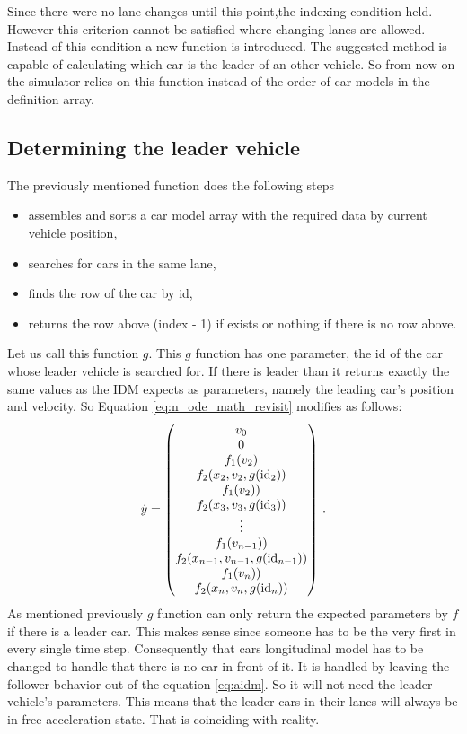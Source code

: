 		Since there were no lane changes until this point,the indexing condition held. However this criterion cannot be satisfied where changing lanes are allowed. Instead of this condition a new function is introduced. The suggested method is capable of calculating which car is the leader of an other vehicle. So from now on the simulator relies on this function instead of the order of car models in the definition array.
		\subsection*{Determining the leader vehicle}
		The previously mentioned function does the following steps
		\begin{itemize}
			\item assembles and sorts a car model array with the required data by current vehicle position,
			\item searches for cars in the same lane,
			\item finds the row of the car by id,
			\item returns the row above (index - 1) if exists or nothing if there is no row above.
		\end{itemize}
		Let us call this function $g$. This $g$ function has one parameter, the id of the car whose leader vehicle is searched for. If there is leader than it returns exactly the same values as the IDM expects as parameters, namely the leading car's position and velocity.
		So Equation \ref{eq:n_ode_math_revisit} modifies as follows:
		\begin{equation}
			\dot{y}=
			\begin{pmatrix}
			v_0\\
			0\\
			f_1(v_2)\\
			f_2(x_{2}, v_{2},g({\rm id}_2))\\
			f_1(v_2))\\
			f_2(x_{3}, v_{3},g({\rm id}_3))\\
			\vdots\\
			f_1(v_{n-1}))\\
			f_2(x_{n-1}, v_{n-1},g({\rm id}_{n-1}))\\
			f_1(v_n))\\
			f_2(x_{n}, v_{n},g({\rm id}_{n}))
			\end{pmatrix}\,.
			\label{eq:n_ode_math_with_find_leading}
		\end{equation}
		As mentioned previously $g$ function can only return the expected parameters by $f$ if there is a leader car. This makes sense since someone has to be the very first in every single time step. Consequently that cars longitudinal model has to be changed to handle that there is no car in front of it. It is handled by leaving the follower behavior out of the equation \ref{eq:aidm}. So it will not need the leader vehicle's parameters. This means that the leader cars in their lanes will always be in free acceleration state. That is coinciding with reality.

